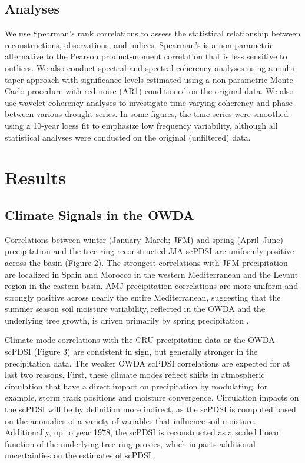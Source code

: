 \documentclass[draft,jgr]{AGUTeX}
\begin{document}
\begin{article}
\subsection{Analyses}
\noindent We use Spearman's rank correlations to assess the statistical relationship between reconstructions, observations, and indices.  Spearman's is a non-parametric alternative to the Pearson product-moment correlation that is less sensitive to outliers. We also conduct spectral and spectral coherency analyses using a multi-taper approach \citep{Thomson:1982,Chave:etal1987,Mann:Lees1996,Czaja:Marshall2001,Huybers:2004} with significance levels estimated using a non-parametric Monte Carlo procedure with red noise (AR1) conditioned on the original data. We also use wavelet coherency analyses \citep{Marauan2004,Maraun2007} to investigate time-varying coherency and phase between various drought series. In some figures, the time series were smoothed using a 10-year loess fit \citep{Cleveland:etal1988} to emphasize low frequency variability, although all statistical analyses were conducted on the original (unfiltered) data.

\section{Results}
\subsection{Climate Signals in the OWDA}
\noindent Correlations between winter (January--March; JFM) and spring (April--June) precipitation and the tree-ring reconstructed JJA scPDSI are uniformly positive across the basin (Figure 2). The strongest correlations with JFM precipitation are localized in Spain and Morocco in the western Mediterranean and the Levant region in the eastern basin.  AMJ precipitation correlations are more uniform and strongly positive across nearly the entire Mediterranean, suggesting that the summer season soil moisture variability, reflected in the OWDA and the underlying tree growth, is driven primarily by spring precipitation \citep[c.f.][]{Touchan:etal2014a}.

\indent Climate mode correlations with the CRU precipitation data or the OWDA scPDSI (Figure 3) are consistent in sign, but generally stronger in the precipitation data. The weaker OWDA scPDSI correlations are expected for at last two reasons. First, these climate modes reflect shifts in atmospheric circulation that have a direct impact on precipitation by modulating, for example, storm track positions and moisture convergence. Circulation impacts on the scPDSI will be by definition more indirect, as the scPDSI is computed based on the anomalies of a variety of variables that influence soil moisture. Additionally, up to year 1978, the scPDSI is reconstructed as a scaled linear function of the underlying tree-ring proxies, which imparts additional uncertainties on the estimates of scPDSI. 


\end{article}
\end{document}
